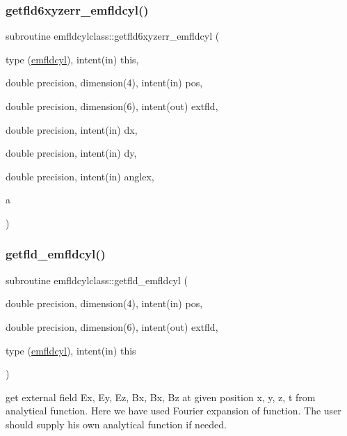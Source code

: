 \subsubsection{\texorpdfstring{getfld6xyzerr\_emfldcyl()}{getfld6xyzerr\_emfldcyl()}}
{\footnotesize\ttfamily subroutine emfldcylclass\+::getfld6xyzerr\+\_\+emfldcyl (\begin{DoxyParamCaption}\item[{type (\mbox{\hyperlink{namespaceemfldcylclass_structemfldcylclass_1_1emfldcyl}{emfldcyl}}), intent(in)}]{this,  }\item[{double precision, dimension(4), intent(in)}]{pos,  }\item[{double precision, dimension(6), intent(out)}]{extfld,  }\item[{double precision, intent(in)}]{dx,  }\item[{double precision, intent(in)}]{dy,  }\item[{double precision, intent(in)}]{anglex,  }\item[{}]{a }\end{DoxyParamCaption})}

\mbox{\label{namespaceemfldcylclass_a521fd72bfe439ce6611678e767ee9263}} 
\subsubsection{\texorpdfstring{getfld\_emfldcyl()}{getfld\_emfldcyl()}}
{\footnotesize\ttfamily subroutine emfldcylclass\+::getfld\+\_\+emfldcyl (\begin{DoxyParamCaption}\item[{double precision, dimension(4), intent(in)}]{pos,  }\item[{double precision, dimension(6), intent(out)}]{extfld,  }\item[{type (\mbox{\hyperlink{namespaceemfldcylclass_structemfldcylclass_1_1emfldcyl}{emfldcyl}}), intent(in)}]{this }\end{DoxyParamCaption})}



get external field Ex, Ey, Ez, Bx, Bx, Bz at given position x, y, z, t from analytical function. Here we have used Fourier expansion of function. The user should supply his own analytical function if needed. 

